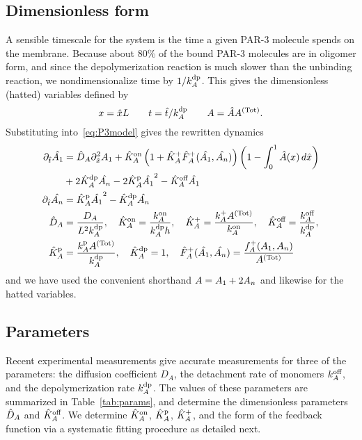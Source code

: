 \documentclass[11pt]{article}
\newcommand{\6}[1]{#1_{\text{6}}}
\newcommand{\3}[1]{#1_{\text{3}}}
\newcommand{\Tot}[1]{#1^\text{(Tot)}}
\newcommand{\A}[1]{#1_A}
\begin{document}
\subsection{Dimensionless form}
A sensible timescale for the system is the time a given PAR-3 molecule spends on the membrane. Because about 80\% of the bound PAR-3 molecules are in oligomer form, and since the depolymerization reaction is much slower than the unbinding reaction, we nondimensionalize time by $1/\A{\kdp}$. This gives the dimensionless (hatted) variables defined by
\begin{equation*}
x = \hat{x} L \qquad t= \hat{t}/\A{\kdp} \qquad A= \hat{A}\Tot{A}.
\end{equation*}
Substituting into\ \eqref{eq:P3model} gives the rewritten dynamics
\begin{subequations}
\label{eq:PAR3gen}
\begin{align}
\nonumber
\Dthat \hat{\MA} & = \DhatA \Dxhat^2 \MA +\KhatonA \left(1+\KhatfA \hat F_A^+(\hat \MA, \hat \PA) \right)\left(1 - \int_0^1 \hat A(x) \, d\hat{x} \right) \\ 
\label{eq:Amono} &+ 2\KhatdpA \hat{\PA}-2\KhatpA \hat{\MA}^2 - \KhatoffA \hat{\MA} \\
\label{eq:Apoly}
\Dthat \hat{\PA} & =\KhatpA \hat{\MA}^2- \KhatdpA \hat{\PA} \\ 
\label{eq:paramsND}
\DhatA &=\frac{\A{D}}{L^2 \A{\kdp}}, \quad \KhatonA=\frac{\A{\kon}}{\A{\kdp} h }, \quad \KhatfA = \frac{\A{\kf}\Tot{A}}{\A{\kon}}, \quad  \KhatoffA = \frac{\A{\koff}}{\A{\kdp}}, \\ \nonumber \KhatpA &= \frac{\A{\kp} \Tot{A}}{\A{\kdp}}, \quad \KhatdpA=1, \quad \hat F_A^+(\hat \MA,\hat \PA) =\frac{\A{f}^+(\MA,\PA)}{\Tot{A}}
\end{align}
\end{subequations}
and we have used the convenient shorthand $A=A_1 + 2 A_n$ and likewise for the hatted variables. 

\subsection{Parameters \label{sec:paramsP3}}
Recent experimental measurements \cite{lang2023oligomerization} give accurate measurements for three of the parameters: the diffusion coefficient $D_A$, the detachment rate of monomers $k^\text{off}_A$, and the depolymerization rate $k^\text{dp}_A$. The values of these parameters are summarized in Table\ \ref{tab:params}, and determine the dimensionless parameters $\hat{D}_A$ and $\hat{K}^\text{off}_A$. We determine $\hat{K}^\text{on}_A$, $\hat{K}^\text{p}_A$, $\hat{K}^\text{+}_A$, and the form of the feedback function via a systematic fitting procedure as detailed next.
\end{document}
